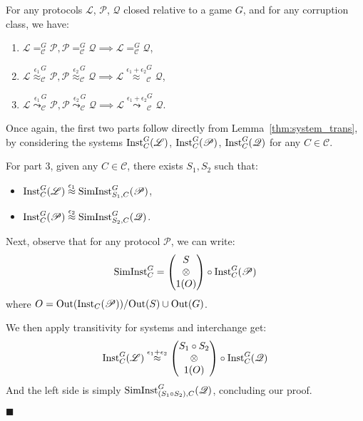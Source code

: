 \begin{theorem}
  \label{thm:trans_relative_equality}
  For any protocols $\mathscr{L}$, $\mathscr{P}$, $\mathscr{Q}$
  closed relative to a game $G$, and for any corruption class, we have:
  \begin{enumerate}
    \item $\mathscr{L} =_{\mathscr{C}}^G \mathscr{P}, \mathscr{P} =_{\mathscr{C}}^G \mathscr{Q} \implies \mathscr{L} =_{\mathscr{C}}^G \mathscr{Q}$,
    \item $\mathscr{L} \overset{\epsilon_1}{\approx}_{\mathscr{C}}^G \mathscr{P}, \mathscr{P} \overset{\epsilon_2}{\approx}_{\mathscr{C}}^G \mathscr{Q} \implies \mathscr{L} \overset{\epsilon_1 + \epsilon_2}{\approx}_{\mathscr{C}}^G \mathscr{Q}$,
    \item $\mathscr{L} \overset{\epsilon_1}{\leadsto}_{\mathscr{C}}^G \mathscr{P}, \mathscr{P} \overset{\epsilon_2}{\leadsto}_{\mathscr{C}}^G \mathscr{Q} \implies \mathscr{L} \overset{\epsilon_1 + \epsilon_2}{\leadsto}_{\mathscr{C}}^G \mathscr{Q}$.
  \end{enumerate}

   Once again, the first two parts follow directly from Lemma~\ref{thm:system_trans},
  by considering the systems $\text{Inst}^G_C(\mathscr{L})$, $\text{Inst}^G_C(\mathscr{P})$,
  $\text{Inst}^G_C(\mathscr{Q})$ for any $C \in \mathscr{C}$.

  For part 3, given any $C \in \mathscr{C}$, there exists $S_1, S_2$ such that:
  \begin{itemize}
    \item $\text{Inst}^G_C(\mathscr{L}) \overset{\epsilon_1}{\approx} \text{SimInst}^G_{S_1, C}(\mathscr{P})$,
    \item $\text{Inst}^G_C(\mathscr{P}) \overset{\epsilon_2}{\approx} \text{SimInst}^G_{S_2, C}(\mathscr{Q})$.
  \end{itemize}
  Next, observe that for any protocol $\mathscr{P}$, we can write:
  $$
  \text{SimInst}^G_C =
  \begin{pmatrix}
    S\cr
    \otimes\cr
    1(O)
  \end{pmatrix}
  \circ
  \text{Inst}^G_C(\mathscr{P})
  $$
  where $O = \text{Out}(\text{Inst}_C(\mathscr{P})) / \text{Out}(S) \cup \text{Out}(G)$.

  We then apply transitivity for systems and interchange get:
  $$
  \text{Inst}^G_C(\mathscr{L}) \overset{\epsilon_1 + \epsilon_2}{\approx}
  \begin{pmatrix}
    S_1 \circ S_2\cr
    \otimes\cr
    1(O)
  \end{pmatrix}
  \circ
  \text{Inst}^G_C(\mathscr{Q})
  $$
  And the left side is simply $\text{SimInst}^G_{(S_1 \circ S_2), C}(\mathscr{Q})$,
  concluding our proof.

  $\blacksquare$
\end{theorem}

